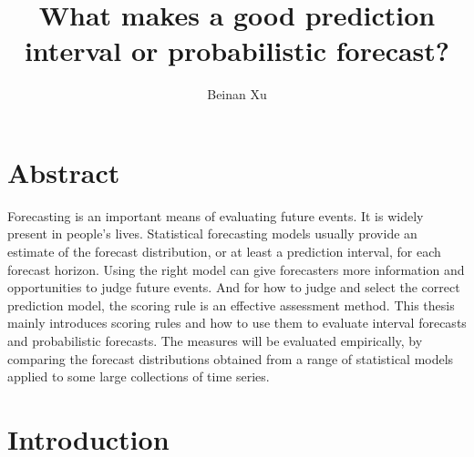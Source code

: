 \documentclass{monashthesis}
\author{Beinan Xu}
\title{What makes a good prediction interval or probabilistic forecast?}
\theoremstyle{definition}
\theoremstyle{definition}
\theoremstyle{definition}
\theoremstyle{remark}
\begin{document}

\titlepage

{\sf\tighttoc\doublespacing}

\clearpage{}\setcounter{page}{0}

\chapter*{Abstract}\label{abstract}

Forecasting is an important means of evaluating future events. It is
widely present in people's lives. Statistical forecasting models usually
provide an estimate of the forecast distribution, or at least a
prediction interval, for each forecast horizon. Using the right model
can give forecasters more information and opportunities to judge future
events. And for how to judge and select the correct prediction model,
the scoring rule is an effective assessment method. This thesis mainly
introduces scoring rules and how to use them to evaluate interval
forecasts and probabilistic forecasts. The measures will be evaluated
empirically, by comparing the forecast distributions obtained from a
range of statistical models applied to some large collections of time
series.

\chapter{Introduction}\label{ch:intro}
\end{document}

